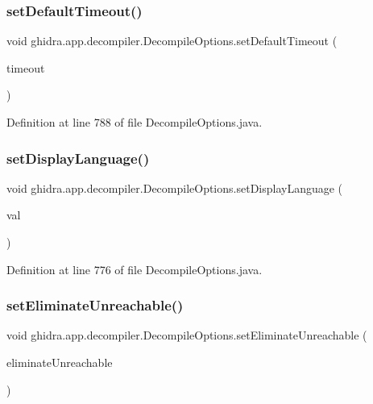 \subsubsection{\texorpdfstring{setDefaultTimeout()}{setDefaultTimeout()}}
{\footnotesize\ttfamily void ghidra.\+app.\+decompiler.\+Decompile\+Options.\+set\+Default\+Timeout (\begin{DoxyParamCaption}\item[{int}]{timeout }\end{DoxyParamCaption})\hspace{0.3cm}{\ttfamily [inline]}}



Definition at line 788 of file Decompile\+Options.\+java.

\mbox{\label{classghidra_1_1app_1_1decompiler_1_1_decompile_options_a3f56ab25e58c3e80f807b42ae1650593}} 
\subsubsection{\texorpdfstring{setDisplayLanguage()}{setDisplayLanguage()}}
{\footnotesize\ttfamily void ghidra.\+app.\+decompiler.\+Decompile\+Options.\+set\+Display\+Language (\begin{DoxyParamCaption}\item[{Decompiler\+Language}]{val }\end{DoxyParamCaption})\hspace{0.3cm}{\ttfamily [inline]}}



Definition at line 776 of file Decompile\+Options.\+java.

\mbox{\label{classghidra_1_1app_1_1decompiler_1_1_decompile_options_a8218f999f2edf040fb14eda6559d9f0d}} 
\subsubsection{\texorpdfstring{setEliminateUnreachable()}{setEliminateUnreachable()}}
{\footnotesize\ttfamily void ghidra.\+app.\+decompiler.\+Decompile\+Options.\+set\+Eliminate\+Unreachable (\begin{DoxyParamCaption}\item[{boolean}]{eliminate\+Unreachable }\end{DoxyParamCaption})\hspace{0.3cm}{\ttfamily [inline]}}



